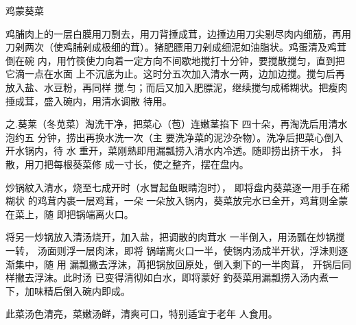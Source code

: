 \begin{recipe}{鸡蒙葵菜}

\ingredients


\preparation

\step 鸡脯肉上的一层白膜用刀剽去，用刀背捶成茸，边捶边用刀尖剔尽肉内细筋，再用
刀剁两次（使鸡脯剁成极细的茸）。猪肥膘用刀剁成细泥如油脂状。鸡蛋清及鸡茸倒在碗
内，用竹筷使力向着一定方向不间歇地搅打十分钟，要搅散搅匀，直到把它滴一点在水面
上不沉底为止。这时分五次加入清水一两，边加边搅。搅匀后再放入盐、水豆粉，再同样
搅.匀；而后又加入肥膘泥，继续搅匀成稀糊状。把瘦肉捶成茸，盛入碗内，用清水调散
待用。

之.葵莱（冬苋菜）淘洗干净，把菜心（苞）连嫩茎掐下 四十朵，再淘洗后用清水泡约五
分钟，捞出再换水洗一次（主 要洗净菜的泥沙杂物）。洗净后把菜心倒入开水锅内，待
水 重开，菜刚熟即用漏瓢捞入清水内冷透。随即捞出挤干水， 抖散，用刀把每根葵菜修
成一寸长，使之整齐，摆在盘内。

炒锅紋入清水，烧至七成开时（水冒起鱼眼睛泡时）， 即将盘内葵菜逐一用手在稀糊状
的鸡茸内裹一层鸡茸，一朵 一朵放入锅内，葵菜放完水已全开，鸡茸则全蒙在菜上，随
即把锅端离火口。

将另一炒锅放入清汤烧开，加入盐，把调散的肉茸水 一半倒入，用汤瓢在炒锅搅一转，
汤面则浮一层肉沫，即将 锅端离火口一半，使锅内汤成半开状，浮沬则逐渐集中，随 用
漏瓢撇去浮沫，苒把锅放回原处，倒入剩下的一半肉茸， 开锅后同样撇去浮沫。此时汤
已变得清彻如白水，即将蒙好 釣葵菜用漏瓢捞入汤内煮一下，加味精后倒入碗内即成。

\features

此菜汤色清亮，菜嫩汤鲜，清爽可口，特别适宜于老年 人食用。

\end{recipe}

